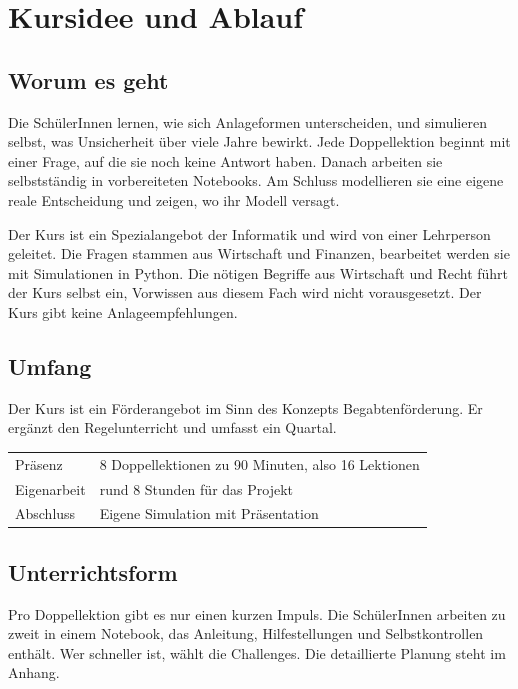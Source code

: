 \chapter{Kursidee und Ablauf}

\section{Worum es geht}
Die SchülerInnen lernen, wie sich Anlageformen unterscheiden, und simulieren selbst, was Unsicherheit über viele Jahre bewirkt. Jede Doppellektion beginnt mit einer Frage, auf die sie noch keine Antwort haben. Danach arbeiten sie selbstständig in vorbereiteten Notebooks. Am Schluss modellieren sie eine eigene reale Entscheidung und zeigen, wo ihr Modell versagt.

Der Kurs ist ein Spezialangebot der Informatik und wird von einer Lehrperson geleitet. Die Fragen stammen aus Wirtschaft und Finanzen, bearbeitet werden sie mit Simulationen in Python. Die nötigen Begriffe aus Wirtschaft und Recht führt der Kurs selbst ein, Vorwissen aus diesem Fach wird nicht vorausgesetzt. Der Kurs gibt keine Anlageempfehlungen.

\section{Umfang}
Der Kurs ist ein Förderangebot im Sinn des Konzepts Begabtenförderung. Er ergänzt den Regelunterricht und umfasst ein Quartal.

\begin{center}
	\small
	\begin{tabular}{@{}p{}p{}@{}}
		\midrule
		Präsenz & 8 Doppellektionen zu 90 Minuten, also 16 Lektionen \\
		Eigenarbeit & rund 8 Stunden für das Projekt \\
		Abschluss & Eigene Simulation mit Präsentation \\
		\midrule
	\end{tabular}
\end{center}

\section{Unterrichtsform}
Pro Doppellektion gibt es nur einen kurzen Impuls. Die SchülerInnen arbeiten zu zweit in einem Notebook, das Anleitung, Hilfestellungen und Selbstkontrollen enthält. Wer schneller ist, wählt die Challenges. Die detaillierte Planung steht im Anhang.

